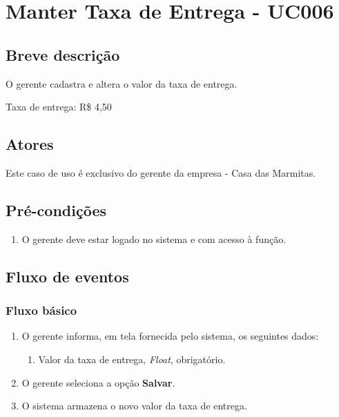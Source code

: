 \chapter{Manter Taxa de Entrega - UC006} \label{uc006}

\section{Breve descrição}

O gerente cadastra e altera o valor da taxa de entrega.

Taxa de entrega: R\$ 4,50

\section{Atores}

Este caso de uso é exclusivo do gerente da empresa - Casa das Marmitas.

\section{Pré-condições}

\begin{enumerate}
	\item O gerente deve estar logado no sistema e com acesso à função.
\end{enumerate}

\section{Fluxo de eventos}

\subsection{Fluxo básico}

\begin{enumerate}
	\item O gerente informa, em tela fornecida pelo sistema, os seguintes dados:
	\begin{enumerate}
		\item Valor da taxa de entrega, \emph{Float}, obrigatório.
	\end{enumerate}
	\item O gerente seleciona a opção \textbf{Salvar}.
	\item O sistema armazena o novo valor da taxa de entrega.
\end{enumerate}

